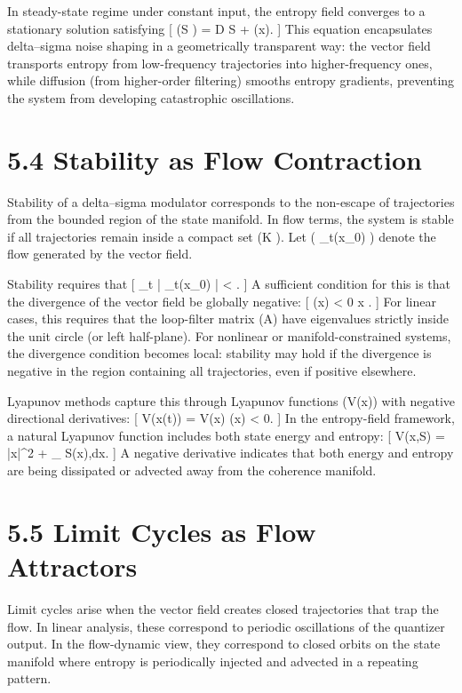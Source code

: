 In steady-state regime under constant input, the entropy field converges to a stationary solution satisfying
[
\nabla \cdot (S ) = D \Delta S + \sigma(x).
]
This equation encapsulates delta–sigma noise shaping in a geometrically transparent way: the vector field transports entropy from low-frequency trajectories into higher-frequency ones, while diffusion (from higher-order filtering) smooths entropy gradients, preventing the system from developing catastrophic oscillations.

\section*{5.4 Stability as Flow Contraction}

Stability of a delta–sigma modulator corresponds to the non-escape of trajectories from the bounded region of the state manifold. In flow terms, the system is stable if all trajectories remain inside a compact set (K \subset {}). Let ( \phi_t(x_0) ) denote the flow generated by the vector field.

Stability requires that
[
\sup_{t } | \phi_t(x_0) | < \infty.
]
A sufficient condition for this is that the divergence of the vector field be globally negative:
[
\nabla \cdot {}(x) < 0 \quad \forall x \in {}.
]
For linear cases, this requires that the loop-filter matrix (A) have eigenvalues strictly inside the unit circle (or left half-plane). For nonlinear or manifold-constrained systems, the divergence condition becomes local: stability may hold if the divergence is negative in the region containing all trajectories, even if positive elsewhere.

Lyapunov methods capture this through Lyapunov functions (V(x)) with negative directional derivatives:
[
 V(x(t)) = \nabla V(x) \cdot {}(x) < 0.
]
In the entropy-field framework, a natural Lyapunov function includes both state energy and entropy:
[
V(x,S) =  |x|^2 + \alpha \int_{} S(x),dx.
]
A negative derivative indicates that both energy and entropy are being dissipated or advected away from the coherence manifold.

\section*{5.5 Limit Cycles as Flow Attractors}

Limit cycles arise when the vector field creates closed trajectories that trap the flow. In linear analysis, these correspond to periodic oscillations of the quantizer output. In the flow-dynamic view, they correspond to closed orbits on the state manifold where entropy is periodically injected and advected in a repeating pattern.

